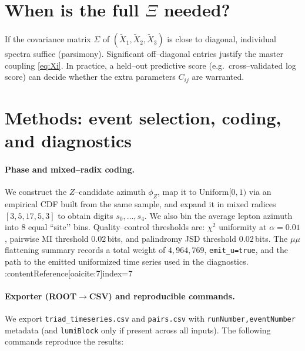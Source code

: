 \documentclass[11pt]{article}
\begin{document}
\section{When is the full $\Xi$ needed?}
If the covariance matrix $\Sigma$ of $(\tilde X_1,\tilde X_2,\tilde X_3)$ is close to diagonal, individual spectra suffice (parsimony). Significant off--diagonal entries justify the master coupling \eqref{eq:Xi}. In practice, a held--out predictive score (e.g.\ cross--validated log score) can decide whether the extra parameters $C_{ij}$ are warranted.



\section{Methods: event selection, coding, and diagnostics}

\paragraph{Phase and mixed–radix coding.}
We construct the $Z$–candidate azimuth $\phi_Z$, map it to $\mathrm{Uniform}[0,1)$ via an empirical CDF built from the same sample, and expand it in mixed radices $[3,5,17,5,3]$ to obtain digits $s_0,\dots,s_4$. We also bin the average lepton azimuth into 8 equal “site’’ bins. Quality–control thresholds are: $\chi^2$ uniformity at $\alpha=0.01$, pairwise MI threshold $0.02$\,bits, and palindromy JSD threshold $0.02$\,bits. The $\mu\mu$ flattening summary records a total weight of $4{,}964{,}769$, \texttt{emit\_u=true}, and the path to the emitted uniformized time series used in the diagnostics. :contentReference[oaicite:7]{index=7}

\paragraph{Exporter (ROOT$\to$CSV) and reproducible commands.}
We export \texttt{triad\_timeseries.csv} and \texttt{pairs.csv} with \texttt{runNumber,eventNumber} metadata (and \texttt{lumiBlock} only if present across all inputs).
The following commands reproduce the results:
\end{document}
